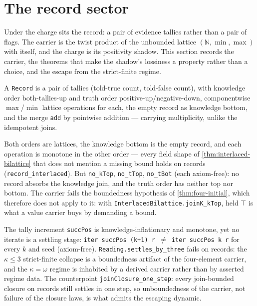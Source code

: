 \section{The record sector}

Under the charge sits the record: a pair of evidence tallies rather than a
pair of flags. The carrier is the twist product of the unbounded lattice
$(\mathbb{N}, \min, \max)$ with itself, and the charge is its positivity
shadow. This section records the carrier, the theorems that make the shadow's
lossiness a property rather than a choice, and the escape from the
strict-finite regime.

\begin{proposition}\label{thm:record-carrier}\leanok{}
A \texttt{Record} is a pair of tallies (told-true count, told-false count),
with knowledge order both-tallies-up and truth order positive-up/negative-down,
componentwise $\max$/$\min$ lattice operations for each, the empty record as
knowledge bottom, and the merge \texttt{add} by pointwise addition ---
carrying multiplicity, unlike the idempotent joins.
\end{proposition}

\begin{theorem}\label{thm:record-interlaced}\leanok{}
Both orders are lattices, the knowledge bottom is the empty record, and each
operation is monotone in the other order --- every field shape of
\ref{thm:interlaced-bilattice} that does not mention a missing bound holds on
records (\texttt{record\_interlaced}). But \texttt{no\_kTop},
\texttt{no\_tTop}, \texttt{no\_tBot} (each axiom-free): no record absorbs the
knowledge join, and the truth order has neither top nor bottom. The carrier
fails the boundedness hypothesis of \ref{thm:four-initial}, which therefore
does not apply to it: with \texttt{InterlacedBilattice.joinK\_kTop}, held
$\top$ is what a value carrier buys by demanding a bound.
\end{theorem}

\begin{theorem}\label{thm:record-escapes-strict-finite}\leanok{}
The tally increment \texttt{succPos} is knowledge-inflationary and monotone,
yet no iterate is a settling stage: \texttt{iter succPos (k+1) r $\neq$ iter
succPos k r} for every $k$ and seed (axiom-free).
\texttt{Reading.settles\_by\_three} fails on records: the $\kappa \le 3$
strict-finite collapse is a boundedness artifact of the four-element carrier,
and the $\kappa = \omega$ regime is inhabited by a derived carrier rather than
by asserted regime data. The counterpoint \texttt{joinClosure\_one\_step}:
every join-bounded closure on records still settles in one step, so
unboundedness of the carrier, not failure of the closure laws, is what admits
the escaping dynamic.
\end{theorem}

